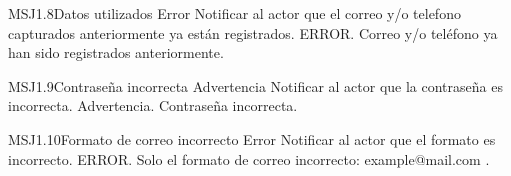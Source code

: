 	\begin{Message}{MSJ1.8}{Datos utilizados}
		\MSGitem[Tipo:] Error
		\MSGitem[Objetivo: ] Notificar al actor que el correo y/o telefono capturados anteriormente ya están registrados.
		\MSGitem[Redacción: ] ERROR. Correo y/o teléfono ya han sido registrados anteriormente.
	\end{Message}

	\begin{Message}{MSJ1.9}{Contraseña incorrecta}
		\MSGitem[Tipo:] Advertencia
		\MSGitem[Objetivo: ] Notificar al actor que la contraseña es incorrecta.
		\MSGitem[Redacción: ] Advertencia. Contraseña incorrecta.
	\end{Message}

	\begin{Message}{MSJ1.10}{Formato de correo incorrecto}
	\MSGitem[Tipo:] Error
	\MSGitem[Objetivo: ] Notificar al actor que el formato es incorrecto.
	\MSGitem[Redacción: ] ERROR. Solo el formato de correo incorrecto: example@mail.com .
\end{Message}
